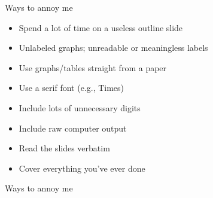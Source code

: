 \documentclass[12pt]{article}
\newcommand{\headsize}{\fontsize{35}{35} \selectfont}
\newcommand{\smallsize}{\fontsize{25}{30} \selectfont}
\begin{document}
\headsize \color{myyellow}
\hfill \begin{minipage}{5.75in}
\centering
Ways to annoy me
\end{minipage}
{\rmfamily

\vspace{30mm} \color{mywhite} \smallsize

\hfill \begin{minipage}{9.5in}

\begin{itemize}
\itemsep18pt
\color{myblue}
\item Spend a lot of time on a useless outline slide

\item Unlabeled graphs; unreadable or meaningless labels

\item Use graphs/tables straight from a paper
\color{mywhite}
\item Use a serif font (e.g., Times)

\color{myblue}
\item Include lots of unnecessary digits

\item Include raw computer output

\item Read the slides verbatim

\item Cover everything you've ever done

\end{itemize}

\end{minipage}
}

\newpage

\headsize \color{myyellow}
\hfill \begin{minipage}{5.75in}
\centering
Ways to annoy me
\end{minipage}

\vspace{30mm} \color{mywhite} \smallsize
\end{document}
